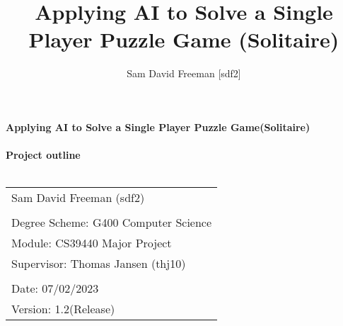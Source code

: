\documentclass[a4paper,10pt]{article}
\title{Applying AI to Solve a Single Player Puzzle Game (Solitaire)}
\author{Sam David Freeman [sdf2]}
\begin{document}
	\begin{titlepage}
		
		\noindent\LARGE\textbf{Applying AI to Solve a Single Player Puzzle Game(Solitaire)}\\ \\ 
		\Large \textbf{Project outline}\\ \\ 
		\normalsize
		\begin{center}
			\begin{table}[H]
				\begin{tabular}{l}
					Sam David Freeman (sdf2) \\
					\\
					Degree Scheme: G400 Computer Science    \\
					Module: CS39440 Major Project    \\
					Supervisor: Thomas Jansen (thj10)    \\
					                          \\
					Date: 07/02/2023               \\
					Version: 1.2(Release)              
				\end{tabular}
			\end{table}
		\end{center}

	\end{titlepage}

\newpage
\end{document}
